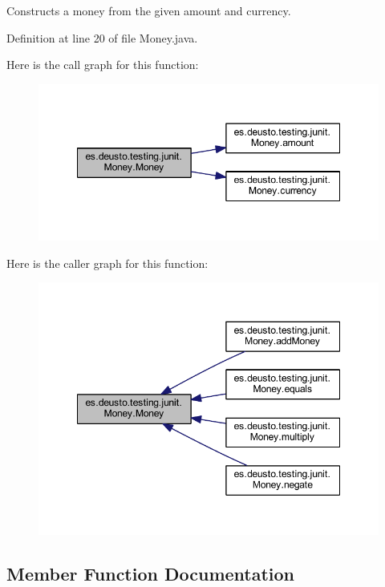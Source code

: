 Constructs a money from the given amount and currency. 

Definition at line 20 of file Money.\+java.

Here is the call graph for this function\+:\nopagebreak
\begin{figure}[H]
\begin{center}
\leavevmode
\includegraphics[width=348pt]{classes_1_1deusto_1_1testing_1_1junit_1_1_money_a6f1749eb364c59ed038f79cf8965e3bc_cgraph}
\end{center}
\end{figure}
Here is the caller graph for this function\+:\nopagebreak
\begin{figure}[H]
\begin{center}
\leavevmode
\includegraphics[width=348pt]{classes_1_1deusto_1_1testing_1_1junit_1_1_money_a6f1749eb364c59ed038f79cf8965e3bc_icgraph}
\end{center}
\end{figure}


\subsection{Member Function Documentation}
\mbox{\label{classes_1_1deusto_1_1testing_1_1junit_1_1_money_a6a3d64861c49dee89ffd0ed0c576045d}} 
